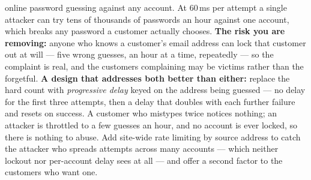 \begin{ans}
        online password guessing against any account. At 60\,ms per attempt a
        single attacker can try tens of thousands of passwords an hour against
        one account, which breaks any password a customer actually chooses.
        \textbf{The risk you are removing:} anyone who knows a customer's email
        address can lock that customer out at will --- five wrong guesses, an
        hour at a time, repeatedly --- so the complaint is real, and the
        customers complaining may be victims rather than the forgetful.
        \textbf{A design that addresses both better than either:} replace the
        hard count with \emph{progressive delay} keyed on the address being
        guessed --- no delay for the first three attempts, then a delay that
        doubles with each further failure and resets on success. A customer who
        mistypes twice notices nothing; an attacker is throttled to a few
        guesses an hour, and no account is ever locked, so there is nothing to
        abuse. Add site-wide rate limiting by source address to catch the
        attacker who spreads attempts across many accounts --- which neither
        lockout nor per-account delay sees at all --- and offer a second factor
        to the customers who want one.
\end{ans}

